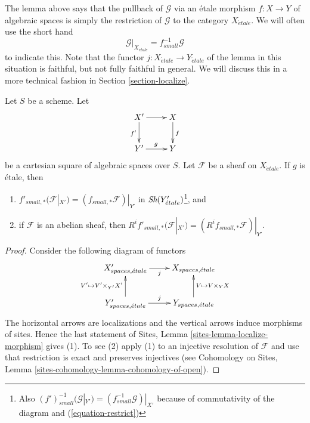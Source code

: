 \noindent
The lemma above says that the pullback of $\mathcal{G}$ via an \'etale morphism
$f : X \to Y$ of algebraic spaces is simply the restriction of $\mathcal{G}$
to the category $X_{\acute{e}tale}$. We will often use the short hand
\begin{equation}
\label{equation-restrict}
\mathcal{G}|_{X_{\acute{e}tale}} = f_{small}^{-1}\mathcal{G}
\end{equation}
to indicate this. Note that the functor
$j : X_{\acute{e}tale} \to Y_{\acute{e}tale}$
of the lemma in this situation is faithful, but not fully faithful in
general. We will discuss this in a more technical fashion in
Section \ref{section-localize}.

\begin{lemma}
\label{lemma-pushforward-etale-base-change}
Let $S$ be a scheme. Let
$$
\xymatrix{
X' \ar[r] \ar[d]_{f'} & X \ar[d]^f \\
Y' \ar[r]^g & Y
}
$$
be a cartesian square of algebraic spaces over $S$. Let
$\mathcal{F}$ be a sheaf on $X_{\acute{e}tale}$. If $g$ is \'etale, then
\begin{enumerate}
\item $f'_{small, *}(\mathcal{F}|_{X'}) = (f_{small, *}\mathcal{F})|_{Y'}$
in $\mathop{\textit{Sh}}\nolimits(Y'_{\acute{e}tale})$\footnote{Also
$(f')_{small}^{-1}(\mathcal{G}|_{Y'}) = (f_{small}^{-1}\mathcal{G})|_{X'}$
because of commutativity of the diagram and (\ref{equation-restrict})}, and
\item if $\mathcal{F}$ is an abelian sheaf, then
$R^if'_{small, *}(\mathcal{F}|_{X'}) = (R^if_{small, *}\mathcal{F})|_{Y'}$.
\end{enumerate}
\end{lemma}

\begin{proof}
Consider the following diagram of functors
$$
\xymatrix{
X'_{spaces, \acute{e}tale} \ar[r]_j &
X_{spaces, \acute{e}tale} \\
Y'_{spaces, \acute{e}tale} \ar[r]^j \ar[u]^{V' \mapsto V' \times_{Y'} X'} &
Y_{spaces, \acute{e}tale} \ar[u]_{V \mapsto V \times_Y X}
}
$$
The horizontal arrows are localizations and the vertical arrows induce
morphisms of sites. Hence the last statement of
Sites, Lemma \ref{sites-lemma-localize-morphism}
gives (1). To see (2) apply (1) to an injective resolution of $\mathcal{F}$
and use that restriction is exact and preserves injectives (see
Cohomology on Sites, Lemma \ref{sites-cohomology-lemma-cohomology-of-open}).
\end{proof}

